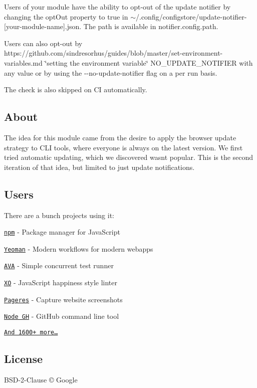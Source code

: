 Users of your module have the ability to opt-\/out of the update notifier by changing the {\ttfamily opt\+Out} property to {\ttfamily true} in {\ttfamily $\sim$/.config/configstore/update-\/notifier-\/\mbox{[}your-\/module-\/name\mbox{]}.json}. The path is available in {\ttfamily notifier.\+config.\+path}.

Users can also opt-\/out by https\+://github.com/sindresorhus/guides/blob/master/set-\/environment-\/variables.\+md \char`\"{}setting the environment variable\char`\"{} {\ttfamily N\+O\+\_\+\+U\+P\+D\+A\+T\+E\+\_\+\+N\+O\+T\+I\+F\+I\+ER} with any value or by using the {\ttfamily -\/-\/no-\/update-\/notifier} flag on a per run basis.

The check is also skipped on CI automatically.

\subsection*{About}

The idea for this module came from the desire to apply the browser update strategy to C\+LI tools, where everyone is always on the latest version. We first tried automatic updating, which we discovered wasn\textquotesingle{}t popular. This is the second iteration of that idea, but limited to just update notifications.

\subsection*{Users}

There are a bunch projects using it\+:


\begin{DoxyItemize}
\item \href{https://github.com/npm/npm}{\tt npm} -\/ Package manager for Java\+Script
\item \href{http://yeoman.io}{\tt Yeoman} -\/ Modern workflows for modern webapps
\item \href{https://ava.li}{\tt A\+VA} -\/ Simple concurrent test runner
\item \href{https://github.com/xojs/xo}{\tt XO} -\/ Java\+Script happiness style linter
\item \href{https://github.com/sindresorhus/pageres}{\tt Pageres} -\/ Capture website screenshots
\item \href{http://nodegh.io}{\tt Node GH} -\/ Git\+Hub command line tool
\end{DoxyItemize}

\href{https://www.npmjs.org/browse/depended/update-notifier}{\tt And 1600+ more…}

\subsection*{License}

B\+S\+D-\/2-\/\+Clause © Google 